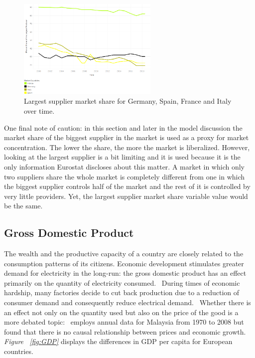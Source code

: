 \documentclass[a4paper,12pt]{book}
\begin{document}
\begin{figure}[tb]
\begin{center}
\captionsetup{justification=centering}
\includegraphics[width=0.6\textwidth]{Images/conc-mc.png}
\caption{Largest supplier market share for Germany, Spain, France and Italy over time. }
\label{fig:conc-mc}
\end{center}
\end{figure}

One final note of caution: in this section and later in the model discussion the market share of the biggest supplier in the market is used as a proxy for market concentration. The lower the share, the more the market is liberalized. However, looking at the largest supplier is a bit limiting and it is used because it is the only information Eurostat discloses about this matter. A market in which only two suppliers share the whole market is completely different from one in which the biggest supplier controls half of the market and the rest of it is controlled by very little providers. Yet, the largest supplier market share variable value would be the same.

\subsection{Gross Domestic Product}

The wealth and the productive capacity of a country are closely related to the consumption patterns of its citizens. Economic development stimulates greater demand for electricity in the long-run: the gross domestic product has an effect primarily on the quantity of electricity consumed.~\cite{jamil2010relationship} During times of economic hardship, many factories decide to cut back production due to a reduction of consumer demand and consequently reduce electrical demand.~\cite{g} Whether there is an effect not only on the quantity used but also on the price of the good is a more debated topic:~\cite{lean2010multivariate} employs annual data for Malaysia from 1970 to 2008 but found that there is no causal relationship between prices and economic growth. \textit{Figure ~\ref{fig:GDP}} displays the differences in GDP per capita for European countries.~\cite{GDP}
\end{document}
